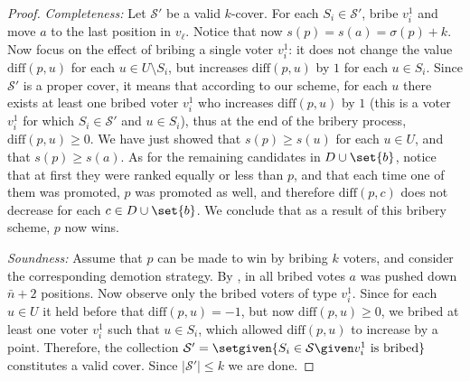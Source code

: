 \documentclass[letterpaper]{article} %
\newcommand{\SC}{\textsc{Set Cover}}
\newcommand{\SB}{\textsc{TNC}}
\newcommand{\ora}[1]{\overrightarrow{#1}}
\newcommand{\abs}[1]{\lvert{#1}\rvert}
\newcommand{\diff}{\mathrm{diff}}
\begin{document}
\begin{proof}
\textit{Completeness:} Let $\mathcal{S}'$ be a valid $k$-cover. For each $S_i \in \mathcal{S}'$, bribe $v_i^1$ and move $a$ to the last position in $v_\ell$. Notice that now $s(p) =s(a) = \sigma(p)+k$. Now focus on the effect of bribing a single voter $v_i^1$:  it does not change the value $\diff(p,u)$ for each $u \in U\setminus S_i$, but increases $\diff(p,u)$ by $1$ for each $u \in S_i$. Since $\mathcal{S}'$  is a proper cover, it means that according to our scheme, for each $u$ there exists at least one bribed voter $v_i^1$  who  increases $\diff(p,u)$ by $1$ (this is a voter $v_i^1$ for which $S_i \in \mathcal{S}'$ and $u \in S_i$), thus at the end of the bribery process, $\diff(p,u) \geq 0$. We have just showed that $s(p) \geq s(u)$ for each $u \in U$, and that $s(p) \geq s(a)$. As for the remaining candidates in $D \cup \set{b}$, notice that at first they were ranked equally or less than $p$, and that each time one of them was promoted, $p$ was promoted as well, and therefore $\diff(p,c)$ does not decrease for each $c \in D \cup \set{b}$. We conclude that as a result of this bribery scheme, $p$ now wins.

\textit{Soundness:} Assume that $p$ can be made to win by bribing $k$ voters, and consider the corresponding demotion strategy. By , in all bribed votes  $a$ was pushed down $\bar{n}+2$ positions. Now observe only the bribed voters of type $v_i^1$. Since  for each $u \in U$ it held before that $\diff(p, u) = -1$, but now $\diff(p, u) \geq 0$, we bribed at least one voter $v_i^1$ such that $u \in S_i$, which allowed $\diff(p, u)$ to increase by a point. Therefore, the collection $\mathcal{S}' = \setgiven{S_i \in \mathcal{S} \given v_i^1 \text{ is bribed}}$ constitutes a valid cover. Since $\abs{\mathcal{S}'} \leq k$ 
we are done.
\end{proof}



\end{document}
